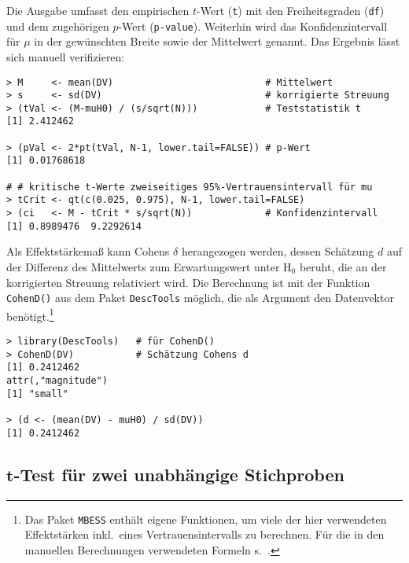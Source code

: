 Die Ausgabe umfasst den empirischen $t$-Wert (\lstinline!t!) mit den Freiheitsgraden (\lstinline!df!) und dem zugehörigen $p$-Wert (\lstinline!p-value!). Weiterhin wird das Konfidenzintervall für $\mu$ in der gewünschten Breite sowie der Mittelwert genannt. Das Ergebnis lässt sich manuell verifizieren:
\begin{lstlisting}
> M     <- mean(DV)                           # Mittelwert
> s     <- sd(DV)                             # korrigierte Streuung
> (tVal <- (M-muH0) / (s/sqrt(N)))            # Teststatistik t
[1] 2.412462

> (pVal <- 2*pt(tVal, N-1, lower.tail=FALSE)) # p-Wert
[1] 0.01768618

# # kritische t-Werte zweiseitiges 95%-Vertrauensintervall für mu
> tCrit <- qt(c(0.025, 0.975), N-1, lower.tail=FALSE)
> (ci   <- M - tCrit * s/sqrt(N))             # Konfidenzintervall
[1] 0.8989476  9.2292614
\end{lstlisting}

Als Effektstärkemaß kann Cohens $\delta$ herangezogen werden, dessen Schätzung $d$ auf der Differenz des Mittelwerts zum Erwartungswert unter $\text{H}_{0}$ beruht, die an der korrigierten Streuung relativiert wird. Die Berechnung ist mit der Funktion \lstinline!CohenD()! aus dem Paket \lstinline!DescTools! möglich, die als Argument den Datenvektor benötigt.\footnote{Das Paket \lstinline!MBESS! enthält eigene Funktionen, um viele der hier verwendeten Effektstärken inkl.\ eines Vertrauensintervalls zu berechnen. Für die in den manuellen Berechnungen verwendeten Formeln s.\ .}
\begin{lstlisting}
> library(DescTools)   # für CohenD()
> CohenD(DV)           # Schätzung Cohens d
[1] 0.2412462
attr(,"magnitude")
[1] "small"

> (d <- (mean(DV) - muH0) / sd(DV))
[1] 0.2412462
\end{lstlisting}

\subsection[\texorpdfstring{$t$}{t}-Test für zwei unabhängige Stichproben]{$\bm{t}$-Test für zwei unabhängige Stichproben}
\label{sec:tTwoInd}

